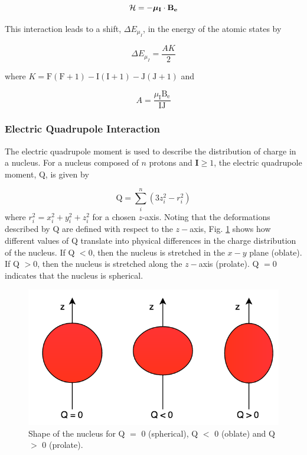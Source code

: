 \begin{equation}
\mathcal{H} = -\boldsymbol{\mu}_{\mathrm{\bf{I}}} \cdot \mathrm{\bf{B_e}}
\end{equation}

\noindent This interaction leads to a shift, $\Delta E_{\mu_I}$, in the energy of the atomic states by

\begin{equation}
\Delta E_{\mu_I} = \frac{AK}{2}
\end{equation}

where $K = \mathrm{F(F+1) - I(I+1) - J(J+1)}$ and 

\begin{equation}
A = \frac{\mu_{\mathrm{I}}\mathrm{B_e}}{\mathrm{IJ}}
\end{equation}

\noindent \subsubsection{Electric Quadrupole Interaction}
The electric quadrupole moment is used to describe the distribution of charge in a nucleus. For a nucleus composed of $n$ protons and $\mathbf{I}\geq1$, the electric quadrupole moment, Q, is given by

\begin{equation}
\mathrm{Q} = \sum_i^n (3z_i^2-r_i^2)
\end{equation}
where $r_i^2 = x_i^2+y_i^2+z_i^2$ for a chosen $z$-axis. Noting that the deformations described by Q are defined with respect to the $z-$axis, Fig. \ref{Q} shows how different values of Q translate into physical differences in the charge distribution of the nucleus. If Q $ < 0$, then the nucleus is stretched in the $x-y$ plane (oblate). If Q $ > 0$, then the nucleus is stretched along the $z-$axis (prolate). Q $=0$ indicates that the nucleus is spherical. 

\begin{figure}[h]
\begin{center}
\includegraphics[width=\textwidth]{Graphics/Q_pic.png}
\caption[Oblate vs. Prolate vs. Spherical]{\small Shape of the nucleus for Q $=$ 0 (spherical), Q $<$ 0 (oblate) and Q $>$ 0 (prolate).\cite{wolf}}
\label{Q}
\end{center}
\end{figure}


